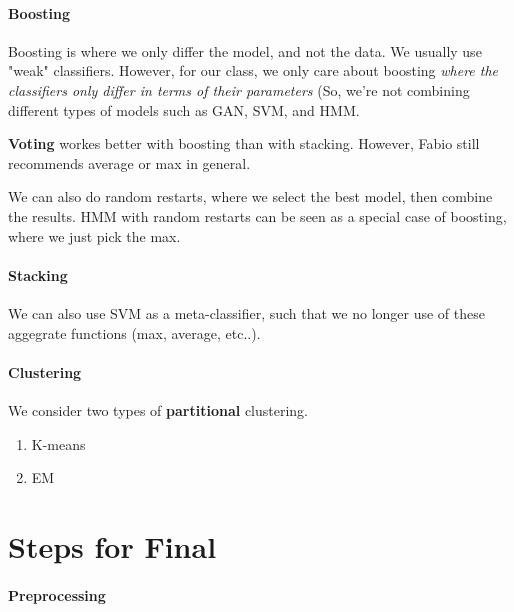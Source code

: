 \documentclass[12pt]{article}
\begin{document}
\subsection{Boosting}
Boosting is where we only differ the model, and not the data. We usually use "weak" classifiers. However, for our class, we only care about boosting \textit{where the classifiers only differ in terms of their parameters} (So, we're not combining different types of models such as GAN, SVM, and HMM.

\textbf{Voting} workes better with boosting than with stacking. However, Fabio still recommends average or max in general. 

We can also do random restarts, where we select the best model, then combine the  results. HMM with random restarts can be seen as a special case of boosting, where we just pick the max.
\subsection{Stacking}

We can also use SVM as a meta-classifier, such that we no longer use of these aggegrate functions (max, average, etc..).

\subsection{Clustering}
We consider two types of \textbf{partitional} clustering. 
\begin{enumerate}
  \item K-means
  \item EM
\end{enumerate}


\part{Steps for Final}

\subsection{Preprocessing}
\end{document}
